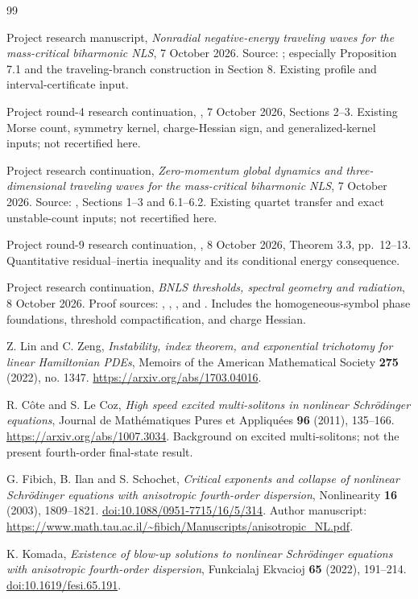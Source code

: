 \documentclass[11pt]{article}
\theoremstyle{definition}
\theoremstyle{remark}
\begin{document}
\begin{thebibliography}{99}
\raggedright
{}
Project research manuscript, \emph{Nonradial negative-energy traveling waves for the mass-critical biharmonic NLS}, 7 October 2026. Source: ; especially Proposition 7.1 and the traveling-branch construction in Section 8. Existing profile and interval-certificate input.

Project round-4 research continuation, , 7 October 2026, Sections 2--3. Existing Morse count, symmetry kernel, charge-Hessian sign, and generalized-kernel inputs; not recertified here.

Project research continuation, \emph{Zero-momentum global dynamics and three-dimensional traveling waves for the mass-critical biharmonic NLS}, 7 October 2026. Source: , Sections 1--3 and 6.1--6.2. Existing quartet transfer and exact unstable-count inputs; not recertified here.

Project round-9 research continuation, , 8 October 2026, Theorem 3.3, pp.~12--13. Quantitative residual--inertia inequality and its conditional energy consequence.

Project research continuation, \emph{BNLS thresholds, spectral geometry and radiation}, 8 October 2026. Proof sources: , , , and . Includes the homogeneous-symbol phase foundations, threshold compactification, and charge Hessian.

Z. Lin and C. Zeng, \emph{Instability, index theorem, and exponential trichotomy for linear Hamiltonian PDEs}, Memoirs of the American Mathematical Society \textbf{275} (2022), no. 1347. \url{https://arxiv.org/abs/1703.04016}.

R. C\^ote and S. Le Coz, \emph{High speed excited multi-solitons in nonlinear Schr\"odinger equations}, Journal de Math\'ematiques Pures et Appliqu\'ees \textbf{96} (2011), 135--166. \url{https://arxiv.org/abs/1007.3034}. Background on excited multi-solitons; not the present fourth-order final-state result.

G. Fibich, B. Ilan and S. Schochet, \emph{Critical exponents and collapse of nonlinear Schr\"odinger equations with anisotropic fourth-order dispersion}, Nonlinearity \textbf{16} (2003), 1809--1821. \href{https://doi.org/10.1088/0951-7715/16/5/314}{doi:10.1088/0951-7715/16/5/314}. Author manuscript: \url{https://www.math.tau.ac.il/~fibich/Manuscripts/anisotropic_NL.pdf}.

K. Komada, \emph{Existence of blow-up solutions to nonlinear Schr\"odinger equations with anisotropic fourth-order dispersion}, Funkcialaj Ekvacioj \textbf{65} (2022), 191--214. \href{https://doi.org/10.1619/fesi.65.191}{doi:10.1619/fesi.65.191}.
\end{thebibliography}
\end{document}
